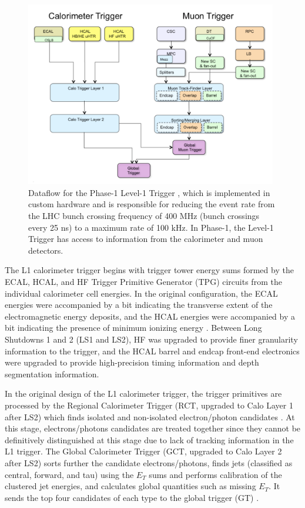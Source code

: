 \begin{figure}[ht]
    \centering
    \includegraphics[width=11cm]{figures/ch-2-cern-cms/phase-1-level-1-trigger-dataflow.png}
    \caption[Dataflow for the Phase-1 Level-1 Trigger.]{Dataflow for the Phase-1 Level-1 Trigger \cite{CMS-TDR-012}, which is implemented in custom hardware and is responsible for reducing the event rate from the LHC bunch crossing frequency of 400 MHz (bunch crossings every 25 ns) to a maximum rate of 100 kHz. In Phase-1, the Level-1 Trigger has access to information from the calorimeter and muon detectors.}
    \label{fig:phase-1-level-1-trigger-dataflow}
\end{figure}

The L1 calorimeter trigger begins with trigger tower energy sums formed by the ECAL, HCAL, and HF Trigger Primitive Generator (TPG) circuits from the individual calorimeter cell energies. In the original configuration, the ECAL energies were accompanied by a bit indicating the transverse extent of the electromagnetic energy deposits, and the HCAL energies were accompanied by a bit indicating the presence of minimum ionizing energy \cite{CERN-LHCC-2000-038}. Between Long Shutdowns 1 and 2 (LS1 and LS2), HF was upgraded to provide finer granularity information to the trigger, and the HCAL barrel and endcap front-end electronics were upgraded to provide high-precision timing information and depth segmentation information. 

In the original design of the L1 calorimeter trigger, the trigger primitives are processed by the Regional Calorimeter Trigger (RCT, upgraded to Calo Layer 1 after LS2) which finds isolated and non-isolated electron/photon candidates \cite{CMS-TDR-012}. At this stage, electrons/photons candidates are treated together since they cannot be definitively distinguished at this stage due to lack of tracking information in the L1 trigger. The Global Calorimeter Trigger (GCT, upgraded to Calo Layer 2 after LS2) sorts further the candidate electrons/photons, finds jets (classified as central, forward, and tau) using the $E_T$ sums and performs calibration of the clustered jet energies, and calculates global quantities such as missing $E_T$. It sends the top four candidates of each type to the global trigger (GT) \cite{CMS-TDR-012}.

